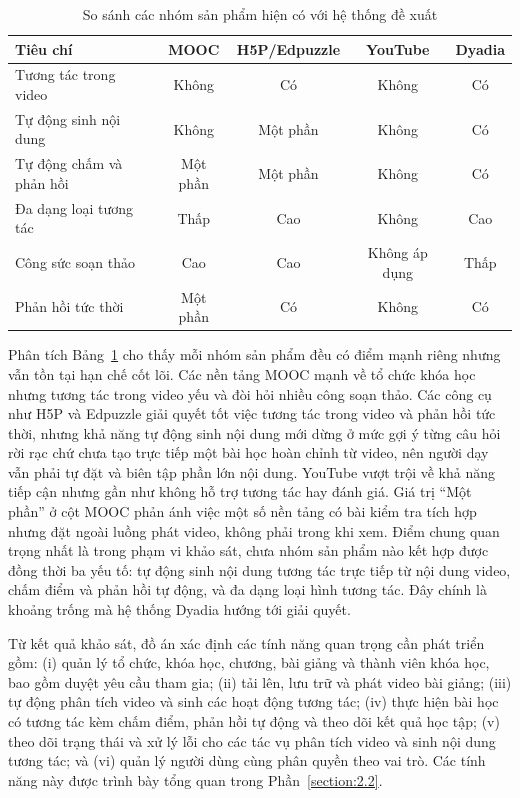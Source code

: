 \documentclass[../DoAn.tex]{subfiles}
\begin{document}
\begin{table}[H]
\centering
\begin{tabular}{|p{3.6cm}|c|c|c|c|}
\hline
\textbf{Tiêu chí} & \textbf{MOOC} & \textbf{H5P/Edpuzzle} & \textbf{YouTube} & \textbf{Dyadia} \\ \hline
Tương tác trong video & Không & Có & Không & Có \\ \hline
Tự động sinh nội dung & Không & Một phần & Không & Có \\ \hline
Tự động chấm và phản hồi & Một phần & Một phần & Không & Có \\ \hline
Đa dạng loại tương tác & Thấp & Cao & Không & Cao \\ \hline
Công sức soạn thảo & Cao & Cao & Không áp dụng & Thấp \\ \hline
Phản hồi tức thời & Một phần & Có & Không & Có \\ \hline
\end{tabular}
\caption{So sánh các nhóm sản phẩm hiện có với hệ thống đề xuất}
\label{table:sosanh}
\end{table}

Phân tích Bảng~\ref{table:sosanh} cho thấy mỗi nhóm sản phẩm đều có điểm mạnh riêng nhưng vẫn tồn tại hạn chế cốt lõi. Các nền tảng MOOC mạnh về tổ chức khóa học nhưng tương tác trong video yếu và đòi hỏi nhiều công soạn thảo. Các công cụ như H5P và Edpuzzle giải quyết tốt việc tương tác trong video và phản hồi tức thời, nhưng khả năng tự động sinh nội dung mới dừng ở mức gợi ý từng câu hỏi rời rạc chứ chưa tạo trực tiếp một bài học hoàn chỉnh từ video, nên người dạy vẫn phải tự đặt và biên tập phần lớn nội dung. YouTube vượt trội về khả năng tiếp cận nhưng gần như không hỗ trợ tương tác hay đánh giá. Giá trị ``Một phần'' ở cột MOOC phản ánh việc một số nền tảng có bài kiểm tra tích hợp nhưng đặt ngoài luồng phát video, không phải trong khi xem. Điểm chung quan trọng nhất là trong phạm vi khảo sát, chưa nhóm sản phẩm nào kết hợp được đồng thời ba yếu tố: tự động sinh nội dung tương tác trực tiếp từ nội dung video, chấm điểm và phản hồi tự động, và đa dạng loại hình tương tác. Đây chính là khoảng trống mà hệ thống Dyadia hướng tới giải quyết.

Từ kết quả khảo sát, đồ án xác định các tính năng quan trọng cần phát triển gồm: (i) quản lý tổ chức, khóa học, chương, bài giảng và thành viên khóa học, bao gồm duyệt yêu cầu tham gia; (ii) tải lên, lưu trữ và phát video bài giảng; (iii) tự động phân tích video và sinh các hoạt động tương tác; (iv) thực hiện bài học có tương tác kèm chấm điểm, phản hồi tự động và theo dõi kết quả học tập; (v) theo dõi trạng thái và xử lý lỗi cho các tác vụ phân tích video và sinh nội dung tương tác; và (vi) quản lý người dùng cùng phân quyền theo vai trò. Các tính năng này được trình bày tổng quan trong Phần~\ref{section:2.2}.
\end{document}
